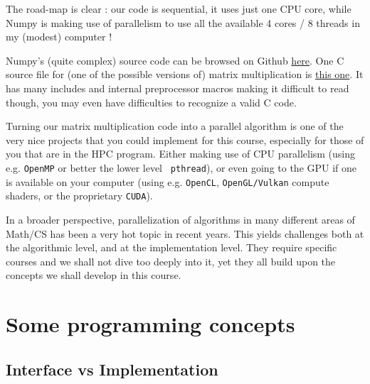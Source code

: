 \documentclass[12pt]{article}
\theoremstyle{plain}
\theoremstyle{remark}
\begin{document}
The road-map is clear : our code is sequential, it uses just one CPU core, while
Numpy is making use of parallelism to use all the available 4 cores / 8 threads
in my (modest) computer ! 

\medskip

Numpy's (quite complex) source code can be browsed on Github 
\href{https://github.com/numpy/numpy/tree/main}{here}. One C source
file for (one of the possible versions of) matrix multiplication is
\href{https://github.com/numpy/numpy/blob/main/numpy/_core/src/umath/matmul.c.src}{this
one}. It has many includes and internal preprocessor macros making it difficult 
to read though, you may even have difficulties to recognize a valid C code.   

\medskip

Turning our matrix multiplication code into a parallel algorithm is one of the
very nice projects that you could implement for this course, especially for
those of you that are in the HPC program. Either making use of
CPU parallelism (using e.g. {\tt OpenMP} or better the lower level {\tt
pthread}), or even going to the GPU if one is 
available on your computer (using e.g. {\tt OpenCL}, {\tt OpenGL/Vulkan} 
compute shaders, or the proprietary {\tt CUDA}).

\medskip

In a broader perspective, parallelization of algorithms in many different areas
of Math/CS has been a very hot topic in recent years. This yields challenges both at the
algorithmic level, and at the implementation level. They require specific courses 
and we shall not dive too deeply into it, yet they all build upon the concepts
we shall develop in this course.


\pagebreak
\section{Some programming concepts}

\subsection{Interface vs Implementation}
\end{document}
